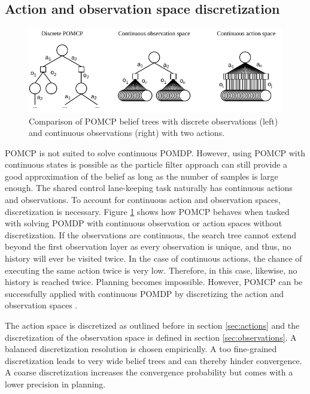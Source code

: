 \subsection{Action and observation space discretization}
\label{sec:discretization}

\begin{figure}[htbp]
    \centering
    \includegraphics[width=1.0\textwidth]{figures/pomcp_continuous.pdf}
    \caption[Comparison of POMCP belief trees with discrete observations and continuous observations]{Comparison of POMCP belief trees with discrete observations (left) and continuous observations (right) with two actions.}
    \label{fig:pomcp_cont}
\end{figure}

POMCP is not suited to solve continuous POMDP. However, using POMCP with continuous states is possible as the particle filter approach can still provide a good approximation of the belief as long as the number of samples is large enough. The shared control lane-keeping task naturally has continuous actions and observations. To account for continuous action and observation spaces, discretization is necessary. Figure \ref{fig:pomcp_cont} shows how POMCP behaves when tasked with solving POMDP with continuous observation or action spaces without discretization. If the observations are continuous, the search tree cannot extend beyond the first observation layer as every observation is unique, and thus, no history will ever be visited twice. In the case of continuous actions, the chance of executing the same action twice is very low. Therefore, in this case, likewise, no history is reached twice. Planning becomes impossible. However, POMCP can be successfully applied with continuous POMDP by discretizing the action and observation spaces \parencite{pomcp_continuous}.

The action space is discretized as outlined before in section \ref{sec:actions} and the discretization of the observation space is defined in section \ref{sec:observations}. A balanced discretization resolution is chosen empirically. A too fine-grained discretization leads to very wide belief trees and can thereby hinder convergence. A coarse discretization increases the convergence probability but comes with a lower precision in planning.

